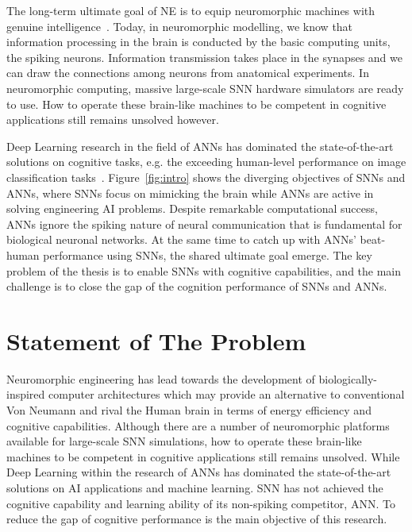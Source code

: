 The long-term ultimate goal of NE is to equip neuromorphic machines with genuine intelligence~\cite{konar1999artificial}.
Today, in neuromorphic modelling, we know that information processing in the brain is conducted by the basic computing units, the spiking neurons.
Information transmission takes place in the synapses and we can draw the connections among neurons from anatomical experiments.
In neuromorphic computing, massive large-scale SNN hardware simulators are ready to use.
How to operate these brain-like machines to be competent in cognitive applications still remains unsolved however.

Deep Learning research in the field of ANNs has dominated the state-of-the-art solutions on cognitive tasks, e.g. the exceeding human-level performance on image classification tasks~\cite{he2015delving}.
Figure~\ref{fig:intro} shows the diverging objectives of SNNs and ANNs, where SNNs focus on mimicking the brain while ANNs are active in solving engineering AI problems.
Despite remarkable computational success, ANNs ignore the spiking nature of neural communication that is fundamental for biological neuronal networks.
At the same time to catch up with ANNs' beat-human performance using SNNs, the shared ultimate goal emerge.
The key problem of the thesis is to enable SNNs with cognitive capabilities, and the main challenge is to close the gap of the cognition performance of SNNs and ANNs.




\section{Statement of The Problem}
\label{sec:problem}
Neuromorphic engineering has lead towards the development of biologically-inspired computer architectures which may provide an alternative to conventional Von Neumann and rival the Human brain in terms of energy efficiency and cognitive capabilities.
Although there are a number of neuromorphic platforms available for large-scale SNN simulations, how to operate these brain-like machines to be competent in cognitive applications still remains unsolved.
While Deep Learning within the research of ANNs has dominated the state-of-the-art solutions on AI applications and machine learning.
SNN has not achieved the cognitive capability and learning ability of its non-spiking competitor, ANN.
To reduce the gap of cognitive performance is the main objective of this research.


